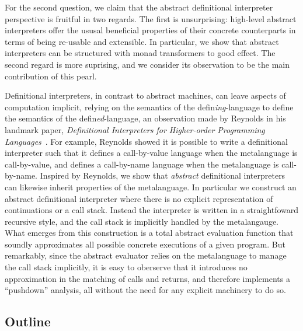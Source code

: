 For the second question, we claim that the abstract definitional
interpreter perspective is fruitful in two regards.  The first is
unsurprising: high-level abstract interpreters offer the ususal
beneficial properties of their concrete counterparts in terms of being
re-usable and extensible.  In particular, we show that abstract
interpreters can be structured with monad transformers to good effect.
The second regard is more suprising, and we consider its observation
to be the main contribution of this pearl.

Definitional interpreters, in contrast to abstract machines, can leave
aspects of computation implicit, relying on the semantics of the
defin\emph{ing}-language to define the semantics of the
defin\emph{ed}-language, an observation made by Reynolds in his landmark
paper, \emph{Definitional Interpreters for Higher-order Programming
  Languages}~\cite{dvanhorn:reynolds-acm72}.  For example, Reynolds showed it is
possible to write a definitional interpreter such that it defines a
call-by-value language when the metalanguage is call-by-value, and
defines a call-by-name language when the metalanguage is call-by-name.
Inspired by Reynolds, we show that \emph{abstract} definitional interpreters can likewise
inherit properties of the metalanguage.  In particular we construct an
abstract definitional interpreter where there is no explicit
representation of continuations or a call stack.  Instead the
interpreter is written in a straightfoward recursive style, and the
call stack is implicitly handled by the metalangauge.  What emerges
from this construction is a total abstract evaluation function that
soundly approximates all possible concrete executions of a given
program.  But remarkably, since the abstract evaluator relies on the
metalanguage to manage the call stack implicitly, it is easy to
oberserve that it introduces no approximation in the matching of calls
and returns, and therefore implements a ``pushdown'' analysis, all
without the need for any explicit machinery to do so.

\subsection*{Outline}

